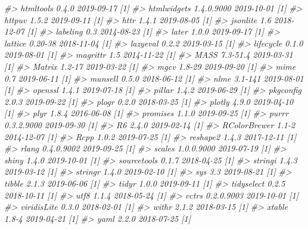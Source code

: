 \documentclass[
  12pt,
]{krantz}
\newenvironment{Shaded}{\begin{snugshade}}{\end{snugshade}}
\newcommand{\CommentTok}[1]{\textcolor[rgb]{0.56,0.35,0.01}{\textit{#1}}}
\begin{document}
\begin{Shaded}
\begin{Highlighting}[]
\CommentTok{#>  htmltools      0.4.0      2019-09-17 [1]}
\CommentTok{#>  htmlwidgets    1.4.0.9000 2019-10-01 [1]}
\CommentTok{#>  httpuv         1.5.2      2019-09-11 [1]}
\CommentTok{#>  httr           1.4.1      2019-08-05 [1]}
\CommentTok{#>  jsonlite       1.6        2018-12-07 [1]}
\CommentTok{#>  labeling       0.3        2014-08-23 [1]}
\CommentTok{#>  later          1.0.0      2019-09-17 [1]}
\CommentTok{#>  lattice        0.20-38    2018-11-04 [1]}
\CommentTok{#>  lazyeval       0.2.2      2019-03-15 [1]}
\CommentTok{#>  lifecycle      0.1.0      2019-08-01 [1]}
\CommentTok{#>  magrittr       1.5        2014-11-22 [1]}
\CommentTok{#>  MASS           7.3-51.4   2019-03-31 [1]}
\CommentTok{#>  Matrix         1.2-17     2019-03-22 [1]}
\CommentTok{#>  mgcv           1.8-29     2019-09-20 [1]}
\CommentTok{#>  mime           0.7        2019-06-11 [1]}
\CommentTok{#>  munsell        0.5.0      2018-06-12 [1]}
\CommentTok{#>  nlme           3.1-141    2019-08-01 [1]}
\CommentTok{#>  openssl        1.4.1      2019-07-18 [1]}
\CommentTok{#>  pillar         1.4.2      2019-06-29 [1]}
\CommentTok{#>  pkgconfig      2.0.3      2019-09-22 [1]}
\CommentTok{#>  plogr          0.2.0      2018-03-25 [1]}
\CommentTok{#>  plotly         4.9.0      2019-04-10 [1]}
\CommentTok{#>  plyr           1.8.4      2016-06-08 [1]}
\CommentTok{#>  promises       1.1.0      2019-09-25 [1]}
\CommentTok{#>  purrr          0.3.2.9000 2019-09-30 [1]}
\CommentTok{#>  R6             2.4.0      2019-02-14 [1]}
\CommentTok{#>  RColorBrewer   1.1-2      2014-12-07 [1]}
\CommentTok{#>  Rcpp           1.0.2      2019-07-25 [1]}
\CommentTok{#>  reshape2       1.4.3      2017-12-11 [1]}
\CommentTok{#>  rlang          0.4.0.9002 2019-09-25 [1]}
\CommentTok{#>  scales         1.0.0.9000 2019-07-19 [1]}
\CommentTok{#>  shiny          1.4.0      2019-10-01 [1]}
\CommentTok{#>  sourcetools    0.1.7      2018-04-25 [1]}
\CommentTok{#>  stringi        1.4.3      2019-03-12 [1]}
\CommentTok{#>  stringr        1.4.0      2019-02-10 [1]}
\CommentTok{#>  sys            3.3        2019-08-21 [1]}
\CommentTok{#>  tibble         2.1.3      2019-06-06 [1]}
\CommentTok{#>  tidyr          1.0.0      2019-09-11 [1]}
\CommentTok{#>  tidyselect     0.2.5      2018-10-11 [1]}
\CommentTok{#>  utf8           1.1.4      2018-05-24 [1]}
\CommentTok{#>  vctrs          0.2.0.9003 2019-10-01 [1]}
\CommentTok{#>  viridisLite    0.3.0      2018-02-01 [1]}
\CommentTok{#>  withr          2.1.2      2018-03-15 [1]}
\CommentTok{#>  xtable         1.8-4      2019-04-21 [1]}
\CommentTok{#>  yaml           2.2.0      2018-07-25 [1]}

\end{Highlighting}
\end{Shaded}
\end{document}
